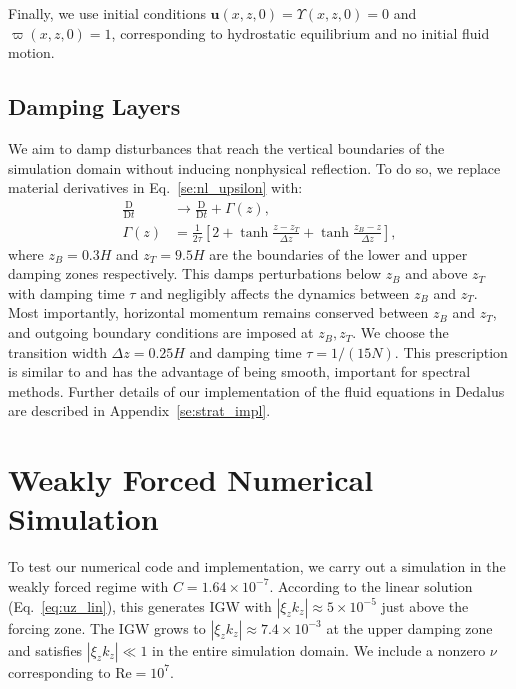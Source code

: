 \documentclass[
        fleqn,
        usenatbib,
    ]{mnras}
\newcommand*{\scinot}[2]{#1\times10^{#2}}
\newcommand*{\md}[2]{\frac{\mathrm{D}#1}{\mathrm{D}#2}}
\newcommand*{\abs}[1]{\left|#1\right|}
\newcommand*{\s}[1]{\left[#1\right]}
\newcommand*{\bm}[1]{\mathbf{#1}}
\begin{document}
Finally, we use initial conditions $\bm{u}(x, z, 0) = \Upsilon(x, z, 0) = 0$ and
$\varpi(x, z, 0) = 1$, corresponding to hydrostatic equilibrium and no initial
fluid motion.

\subsection{Damping Layers}\label{ss:damping}

We aim to damp disturbances that reach the vertical boundaries of the simulation
domain without inducing nonphysical reflection. To do so, we replace material
derivatives in Eq.~\eqref{se:nl_upsilon} with:
\begin{align}
    \md{}{t} &\to \md{}{t} + \Gamma(z),\\
    \Gamma(z) &= \frac{1}{2\tau}\s{2 + \tanh \frac{z - z_T}{\Delta z}
        + \tanh \frac{z_B - z}{\Delta z}},\label{eq:Gamma}
\end{align}
where $z_B = 0.3H$ and $z_T = 9.5H$ are the boundaries of the lower and upper
damping zones respectively. This damps perturbations below $z_B$ and
above $z_T$ with damping time $\tau$ and negligibly affects the dynamics between
$z_B$ and $z_T$. \textcolor{Corr}{Most importantly, horizontal momentum remains
conserved between $z_B$ and $z_T$, and outgoing boundary conditions are imposed
at $z_B, z_T$}. We choose the transition width $\Delta z = 0.25H$ and damping
time $\tau = 1 / (15N)$. This prescription is similar to \citet{lecoanet_damp}
and has the advantage of being smooth, important for spectral methods. Further
details of our implementation of the fluid equations in Dedalus are described in
Appendix~\ref{se:strat_impl}.

\section{Weakly Forced Numerical Simulation}\label{s:weak_sim}

To test our numerical code and implementation, we carry out a simulation in the
weakly forced regime with $C = \scinot{1.64}{-7}$. According to the linear
solution (Eq.~\eqref{eq:uz_lin}), this generates IGW with $\abs{\xi_z k_z}
\approx \scinot{5}{-5}$ just above the forcing zone. The IGW grows to $\abs{\xi_z
k_z} \approx \scinot{7.4}{-3}$ at the upper damping zone and satisfies
$\abs{\xi_z k_z} \ll 1$ in the entire simulation domain. We include a nonzero
$\nu$ corresponding to $\mathrm{Re} = 10^7$.
\end{document}
